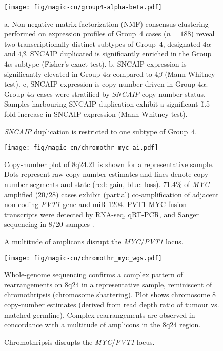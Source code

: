 \documentclass[11pt,letterpaper]{article}
\theoremstyle{definition}
\begin{document}
\begin{figure}[h]
	\begin{center}
		\texttt{[image: fig/magic-cn/group4-alpha-beta.pdf]}
	\end{center}
	\caption{\emph{SNCAIP} duplication is restricted to one subtype of Group~4.}
	\textsf{a}, Non-negative matrix factorization (NMF) consensus clustering performed on expression profiles of Group~4 cases ($n = 188$) reveal two transcriptionally distinct subtypes of Group~4, designated $4\alpha$ and $4\beta$. SNCAIP duplicated is significantly enriched in the Group $4\alpha$ subtype (Fisher's exact test).
	\textsf{b}, SNCAIP expression is significantly elevated in Group $4\alpha$ compared to $4\beta$ (Mann-Whitney test).
	\textsf{c}, SNCAIP expression is copy number-driven in Group $4\alpha$. Group $4\alpha$ cases were stratified by \emph{SNCAIP} copy-number status. Samples harbouring SNCAIP duplication exhibit a significant \~1.5-fold increase in SNCAIP expression (Mann-Whitney test).
	\label{fig:group4-alpha-beta}
\end{figure}

\clearpage

\begin{figure}[h]
	\begin{center}
		\texttt{[image: fig/magic-cn/chromothr\_myc\_ai.pdf]}
	\end{center}
	\caption{A multitude of amplicons disrupt the \emph{MYC}/\emph{PVT1} locus.}
	Copy-number plot of 8q24.21 is shown for a representative sample. Dots represent raw copy-number estimates and lines denote copy-number segments and state (red: gain, blue: loss). 71.4\% of \emph{MYC}-amplified (20/28) cases exhibit (partial) co-amplification of adjacent non-coding \emph{PVT1} gene and miR-1204. PVT1-MYC fusion transcripts were detected by RNA-seq, qRT-PCR, and Sanger sequencing in 8/20 samples .
	\label{fig:chromothr_myc}
\end{figure}

\begin{figure}[h]
	\begin{center}
		\texttt{[image: fig/magic-cn/chromothr\_myc\_wgs.pdf]}
	\end{center}
	\caption{Chromothripsis disrupts the \emph{MYC}/\emph{PVT1} locus.}
	Whole-genome sequencing confirms a complex pattern of rearrangements on 8q24 in a representative sample, reminiscent of chromothripsis (chromosome shattering).
	Plot shows chromosome 8 copy-number estimates (derived from read depth ratio of tumour vs. matched germline).
	Complex rearrangements are observed in concordance with a multitude of amplicons in the 8q24 region.
	\label{fig:chromothr_myc_wgs}
\end{figure}
\end{document}

